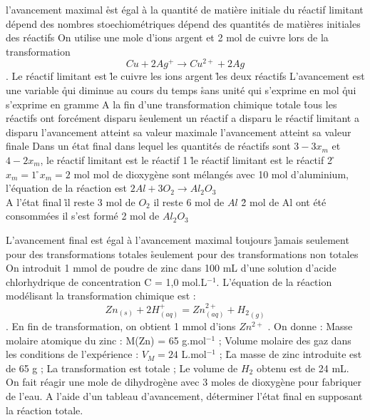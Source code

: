\q l'avancement maximal 
\r est égal à la quantité de matière initiale du réactif limitant 
\rv dépend des nombres stoechiométriques 
\rv dépend des quantités de matières initiales des réactifs 
\q On utilise une mole d'ions argent et 2 mol de cuivre lors de la transformation $$Cu+2Ag^+\longrightarrow Cu^{2+}+2Ag$$. Le réactif limitant est 
\r le cuivre 
\rv les ions argent 
\r les deux réactifs 
\q L'avancement est une variable 
\r qui diminue au cours du temps 
\r sans unité 
\rv qui s'exprime en mol 
\r qui s'exprime en gramme 
\q A la fin d'une transformation chimique totale
\r tous les réactifs ont forcément disparu
\r  seulement un réactif a disparu 
\rv le réactif limitant a disparu 
\rv l'avancement atteint sa valeur maximale
\rv l'avancement atteint sa valeur finale 
\q Dans un état final dans lequel les quantités de réactifs sont $3 - 3 x_m$ et $4 - 2 x_m$,  
\rv le réactif limitant est le réactif 1 
\r le réactif limitant est le réactif 2
\r $x_m=1$ 
\r $x_m=2$ mol 
 mol de dioxygène sont mélangés avec 10 mol d'aluminium, l'équation de la réaction est $2Al+3O_2\rightarrow Al_2O_3$\\ A l'état final 
\r il reste 3 mol de $O_2$ 
\rv il reste 6 mol de $Al$ 
\r 2 mol de Al ont été consommées
\rv il s'est formé 2 mol de $Al_2O_3$

\q L'avancement final est égal à l'avancement maximal 
\r toujours 
\r jamais 
\rv seulement pour des transformations totales 
\r seulement pour des transformations non totales
\q	
On introduit 1 mmol de poudre de zinc dans 100 mL d'une solution d'acide chlorhydrique de concentration C = 1,0 mol.L$^{-1}$. L'équation de la réaction modélisant la transformation chimique est : $$Zn_{(s)} + 2 H^+_{(aq)} = Zn^{2+}_{(aq)} + {H_2}_{(g)} $$.
En fin de transformation, on obtient 1 mmol d'ions $Zn^{2+}$ .
On donne : 	Masse molaire atomique du zinc : M(Zn) = 65 g.mol$^{-1}$ ;
Volume molaire des gaz dans les conditions de l'expérience : $V_M = 24$ L.mol$^{-1}$ ; 
\r
La masse de zinc introduite est de 65 g ;
\rv
La transformation est totale ;
\rv
Le volume de $H_2$ obtenu est de 24 mL.
\q On fait réagir une mole de dihydrogène avec 3 moles de dioxygène pour fabriquer de l'eau. A l'aide d'un tableau d'avancement, déterminer l'état final en supposant la réaction totale.
